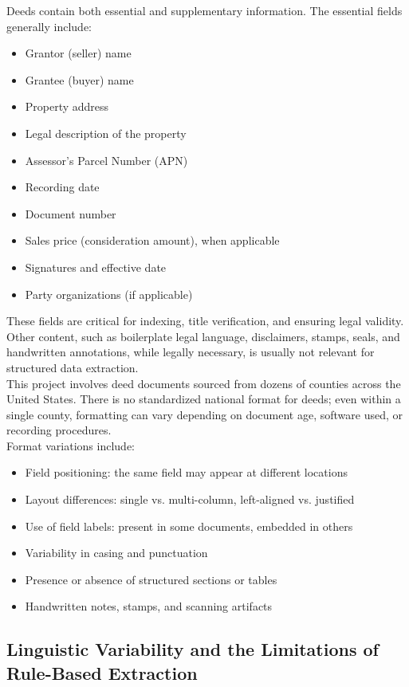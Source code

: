 \documentclass{article}
\begin{document}
Deeds contain both essential and supplementary information. The essential fields generally include:
\begin{itemize}
\item Grantor (seller) name
\item Grantee (buyer) name
\item Property address
\item Legal description of the property
\item Assessor's Parcel Number (APN)
\item Recording date
\item Document number
\item Sales price (consideration amount), when applicable
\item Signatures and effective date
\item Party organizations (if applicable)
\end{itemize}

These fields are critical for indexing, title verification, and ensuring legal validity. Other content, such as boilerplate legal language, disclaimers, stamps, seals, and handwritten annotations, while legally necessary, is usually not relevant for structured data extraction. \\

This project involves deed documents sourced from dozens of counties across the United States. There is no standardized national format for deeds; even within a single county, formatting can vary depending on document age, software used, or recording procedures. \\

Format variations include:
\begin{itemize}
\item Field positioning: the same field may appear at different locations
\item Layout differences: single vs. multi-column, left-aligned vs. justified
\item Use of field labels: present in some documents, embedded in others
\item Variability in casing and punctuation
\item Presence or absence of structured sections or tables
\item Handwritten notes, stamps, and scanning artifacts
\end{itemize}

\subsection{Linguistic Variability and the Limitations of Rule-Based Extraction}
\end{document}
